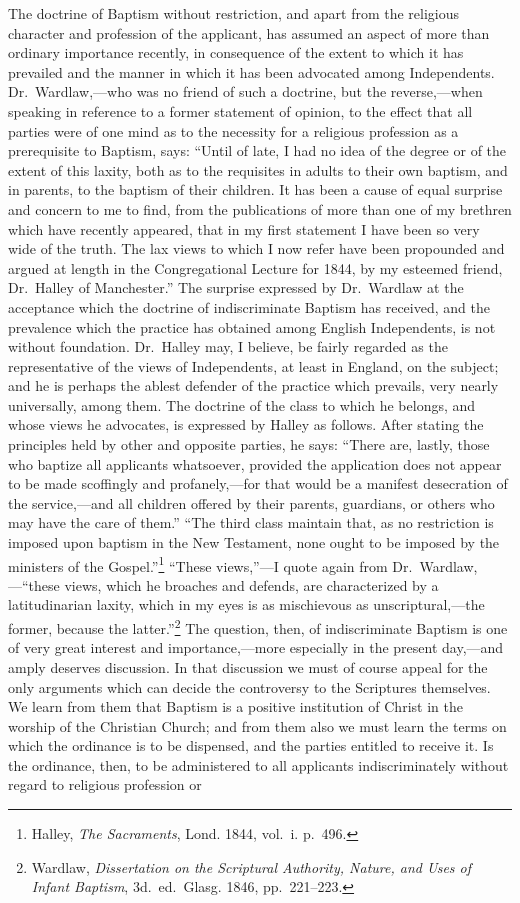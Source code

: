\documentclass[
]{book}
\begin{document}
The doctrine of Baptism without restriction, and apart from the religious character and profession of the applicant, has assumed an aspect of more than ordinary importance recently, in consequence of the extent to which it has prevailed and the manner in which it has been advocated among Independents. Dr.~Wardlaw,---who was no friend of such a doctrine, but the reverse,---when speaking in reference to a former statement of opinion, to the effect that all parties were of one mind as to the necessity for a religious profession as a prerequisite to Baptism, says: ``Until of late, I had no idea of the degree or of the extent of this laxity, both as to the requisites in adults to their own baptism, and in parents, to the baptism of their children. It has been a cause of equal surprise and concern to me to find, from the publications of more than one of my brethren which have recently appeared, that in my first statement I have been so very wide of the truth. The lax views to which I now refer have been propounded and argued at length in the Congregational Lecture for 1844, by my esteemed friend, Dr.~Halley of Manchester.'' The surprise expressed by Dr.~Wardlaw at the acceptance which the doctrine of indiscriminate Baptism has received, and the prevalence which the practice has obtained among English Independents, is not without foundation. Dr.~Halley may, I believe, be fairly regarded as the representative of the views of Independents, at least in England, on the subject; and he is perhaps the ablest defender of the practice which prevails, very nearly universally, among them. The doctrine of the class to which he belongs, and whose views he advocates, is expressed by Halley as follows. After stating the principles held by other and opposite parties, he says: ``There are, lastly, those who baptize all applicants whatsoever, provided the application does not appear to be made scoffingly and profanely,---for that would be a manifest desecration of the service,---and all children offered by their parents, guardians, or others who may have the care of them.'' ``The third class maintain that, as no restriction is imposed upon baptism in the New Testament, none ought to be imposed by the ministers of the Gospel.''\footnote{Halley, \emph{The Sacraments}, Lond. 1844, vol.~i. p.~496.} ``These views,''---I quote again from Dr.~Wardlaw,---``these views, which he broaches and defends, are characterized by a latitudinarian laxity, which in my eyes is as mischievous as unscriptural,---the former, because the latter.''\footnote{Wardlaw, \emph{Dissertation on the Scriptural Authority, Nature, and Uses of Infant Baptism}, 3d.~ed.~Glasg. 1846, pp.~221--223.} The question, then, of indiscriminate Baptism is one of very great interest and importance,---more especially in the present day,---and amply deserves discussion. In that discussion we must of course appeal for the only arguments which can decide the controversy to the Scriptures themselves. We learn from them that Baptism is a positive institution of Christ in the worship of the Christian Church; and from them also we must learn the terms on which the ordinance is to be dispensed, and the parties entitled to receive it. Is the ordinance, then, to be administered to all applicants indiscriminately without regard to religious profession or 
\end{document}
